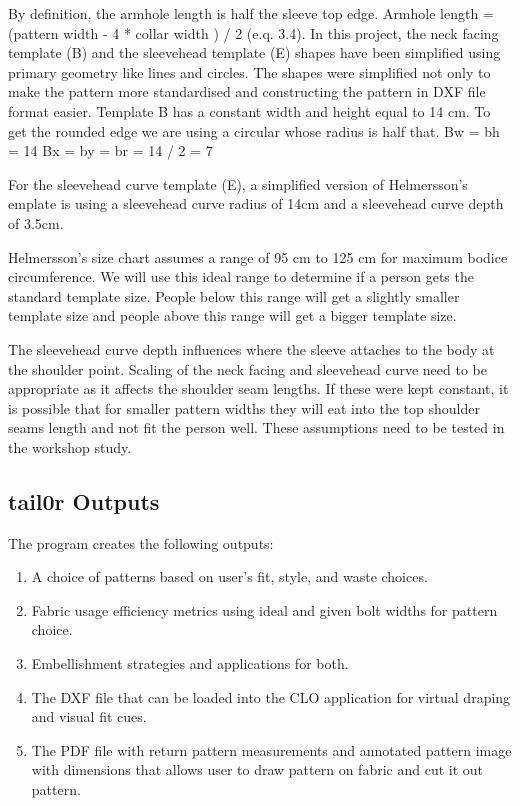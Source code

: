 By definition, the armhole length is half the sleeve top edge.
	Armhole length = (pattern width - 4 * collar width ) / 2  (e.q. 3.4).
In this project, the neck facing template (B) and the sleevehead template (E) shapes have been simplified using primary geometry like lines and circles. The shapes were simplified not only to make the pattern more standardised and constructing the pattern in DXF file format easier. 
Template B has a constant width and height equal to 14 cm. To get the rounded edge we are using a circular whose radius is half that. 
	Bw = bh = 14
	Bx = by  = br = 14 / 2 = 7

For the sleevehead curve template (E),  a simplified version of Helmersson’s emplate is using a sleevehead curve radius of 14cm and a sleevehead curve depth of 3.5cm.

Helmersson’s size chart assumes a range of 95 cm to 125 cm for maximum bodice circumference. We will use this ideal range to determine if a person gets the standard template size. People below this range will get a slightly smaller template size and people above this range will get a bigger template size. 

The sleevehead curve depth influences where the sleeve attaches to the body at the shoulder point. Scaling of the neck facing and sleevehead curve need to be appropriate as it affects the shoulder seam lengths. If these were kept constant, it is possible that for smaller pattern widths they will eat into the top shoulder seams length and not fit the person well. These assumptions need to be tested in the workshop study.


\subsection{tail0r Outputs}
The program creates the following outputs:
\begin{enumerate}
    \item A choice of patterns based on user's fit, style, and waste choices.
    \item Fabric usage efficiency metrics using ideal and given bolt widths for pattern choice.
    \item Embellishment strategies and applications for both.
    \item The DXF file that can be loaded into the CLO application for virtual draping and visual fit cues.
    \item The PDF file with return pattern measurements and annotated pattern image with dimensions that allows user to draw pattern on fabric and cut it out pattern.
\end{enumerate}

